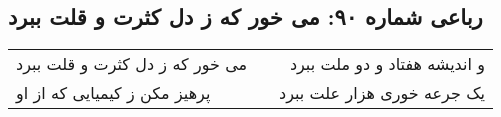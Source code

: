\begin{center}
\section*{رباعی شماره ۹۰: می خور که ز دل کثرت و قلت ببرد}
\label{sec:sh090}
\begin{longtable}{l p{0.5cm} r}
می خور که ز دل کثرت و قلت ببرد
&&
و اندیشه هفتاد و دو ملت ببرد
\\
پرهیز مکن ز کیمیایی که از او
&&
یک جرعه خوری هزار علت ببرد
\\
\end{longtable}
\end{center}
